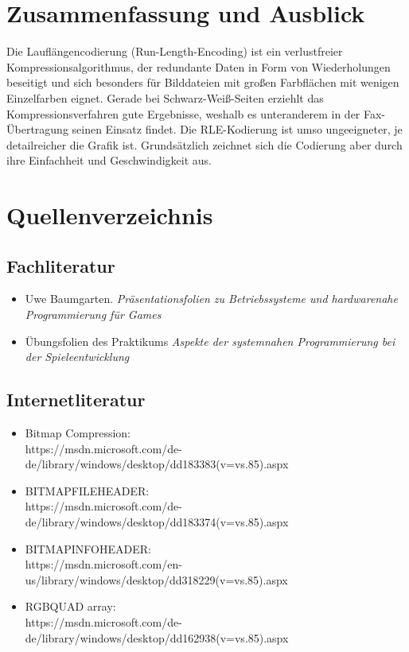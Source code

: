 \documentclass[11pt]{scrartcl}
\begin{document}
\section{Zusammenfassung und Ausblick}

Die Lauflängencodierung (Run-Length-Encoding) ist ein verlustfreier Kompressionsalgorithmus, der redundante Daten in Form von Wiederholungen beseitigt und sich besonders für Bilddateien mit großen Farbflächen mit wenigen Einzelfarben eignet. Gerade bei Schwarz-Weiß-Seiten erziehlt das Kompressionsverfahren gute Ergebnisse, weshalb es unteranderem in der Fax-Übertragung seinen Einsatz findet. Die RLE-Kodierung ist umso ungeeigneter, je detailreicher die Grafik ist. Grundsätzlich zeichnet sich die Codierung aber durch ihre Einfachheit und Geschwindigkeit aus.

\newpage
\section{Quellenverzeichnis}

\subsection{Fachliteratur}

\begin{itemize}
\item Uwe Baumgarten. \textit{Präsentationsfolien zu \frqq Betriebssysteme und hardwarenahe Programmierung für Games\flqq}
\item Übungsfolien des Praktikums \textit{Aspekte der systemnahen Programmierung bei der Spieleentwicklung}

\end{itemize}

\subsection{Internetliteratur}

\begin{itemize}
\item Bitmap Compression:\\https://msdn.microsoft.com/de-de/library/windows/desktop/dd183383(v=vs.85).aspx
\item BITMAPFILEHEADER:\\https://msdn.microsoft.com/de-de/library/windows/desktop/dd183374(v=vs.85).aspx
\item BITMAPINFOHEADER:\\https://msdn.microsoft.com/en-us/library/windows/desktop/dd318229(v=vs.85).aspx
\item RGBQUAD array:\\https://msdn.microsoft.com/de-de/library/windows/desktop/dd162938(v=vs.85).aspx
\end{itemize}
\end{document}
